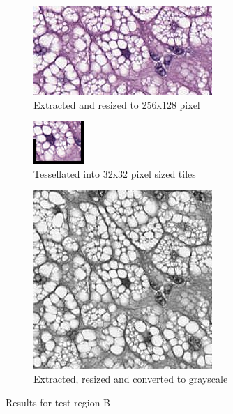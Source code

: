 \begin{figure}[H]
\begin{subfigure}{.5\textwidth}
		\includegraphics[width=.8\linewidth]{img/ts_test/3_r128.jpeg}
		\caption{Extracted and resized to 256x128 pixel}
		\label{subfig5:b3}
	\end{subfigure}
	\begin{subfigure}{.5\textwidth}
		\centering
		\includegraphics{img/ts_test/3_stitched.jpeg}
		\caption{Tessellated into 32x32 pixel sized tiles}
		\label{subfig5:b4}
	\end{subfigure}
	\begin{subfigure}{.5\textwidth}
		\centering
		\includegraphics[width=.8\linewidth]{img/ts_test/3_g.jpeg}
		\caption{Extracted, resized and converted to grayscale}
		\label{subfig5:b5}
	\end{subfigure}
	\caption{Results for test region B}
	\label{fig5_result2}
\end{figure}

